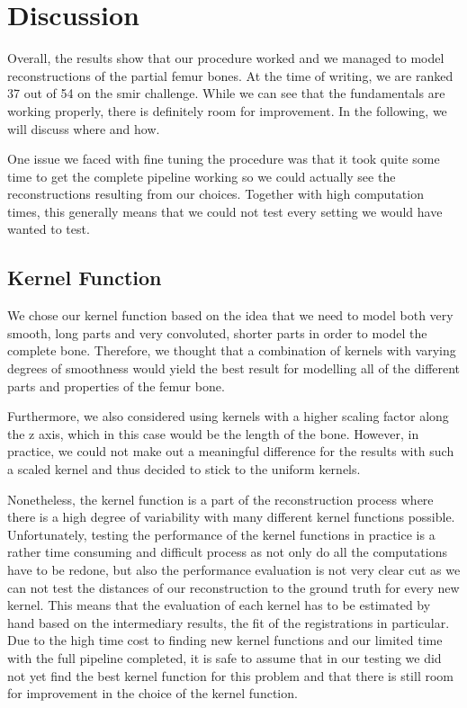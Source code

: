 \section{Discussion}
\label{sec:discussion}
Overall, the results show that our procedure worked and we managed to model reconstructions of the partial femur bones. At the time of writing, we are ranked 37 out of 54 on the smir challenge. While we can see that the fundamentals are working properly, there is definitely room for improvement. In the following, we will discuss where and how.

One issue we faced with fine tuning the procedure was that it took quite some time to get the complete pipeline working so we could actually see the reconstructions resulting from our choices. Together with high computation times, this generally means that we could not test every setting we would have wanted to test.
		

\subsection{Kernel Function}
\label{subsec:kernfuncdisc}
We chose our kernel function based on the idea that we need to model both very smooth, long parts and very convoluted, shorter parts in order to model the complete bone. Therefore, we thought that a combination of kernels with varying degrees of smoothness would yield the best result for modelling all of the different parts and properties of the femur bone. 

Furthermore, we also considered using kernels with a higher scaling factor along the z axis, which in this case would be the length of the bone. However, in practice, we could not make out a meaningful difference for the results with such a scaled kernel and thus decided to stick to the uniform kernels.

Nonetheless, the kernel function is a part of the reconstruction process where there is a high degree of variability with many different kernel functions possible. Unfortunately, testing the performance of the kernel functions in practice is a rather time consuming and difficult process as not only do all the computations have to be redone, but also the performance evaluation is not very clear cut as we can not test the distances of our reconstruction to the ground truth for every new kernel. This means that the evaluation of each kernel has to be estimated by hand based on the intermediary results, the fit of the registrations in particular. Due to the high time cost to finding new kernel functions and our limited time with the full pipeline completed, it is safe to assume that in our testing we did not yet find the best kernel function for this problem and that there is still room for improvement in the choice of the kernel function.

